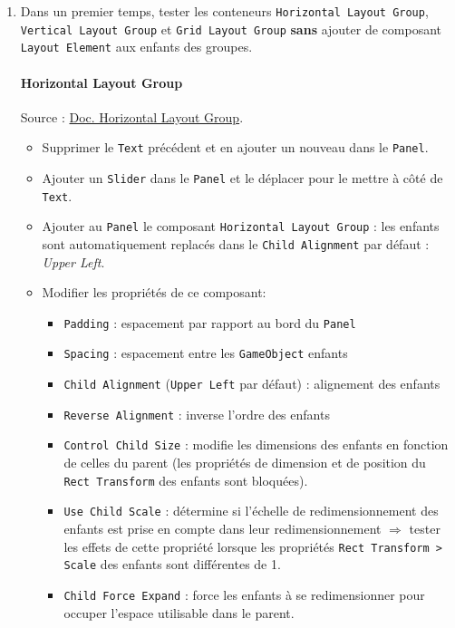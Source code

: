 \documentclass[a4paper,10pt]{article}
\newenvironment{solution}%
{\begin{tcolorbox}[breakable,colback=red!5!white,colframe=red!75!black,title=Solution]}%
{\end{tcolorbox}}
\begin{document}
\begin{enumerate}
	\item Dans un premier temps, tester les conteneurs \texttt{Horizontal Layout Group}, \texttt{Vertical Layout Group} et \texttt{Grid Layout Group} \textbf{sans} ajouter de composant \texttt{Layout Element} aux enfants des groupes.
	
\ifversionenseignant
\begin{solution}
	\paragraph{Horizontal Layout Group}
	
	Source : \href{https://docs.unity3d.com/Packages/com.unity.ugui@1.0/manual/script-HorizontalLayoutGroup.html}{Doc. Horizontal Layout Group}.
	
	\begin{itemize}
		\item Supprimer le \texttt{Text} précédent et en ajouter un nouveau dans le \texttt{Panel}.
		\item Ajouter un \texttt{Slider} dans le \texttt{Panel} et le déplacer pour le mettre à côté de \texttt{Text}.
		\item Ajouter au \texttt{Panel} le composant \texttt{Horizontal Layout Group} : les enfants sont automatiquement replacés dans le \texttt{Child Alignment} par défaut : \textit{Upper Left}.
		\item Modifier les propriétés de ce composant:
		\begin{itemize}
			\item \texttt{Padding} : espacement par rapport au bord du \texttt{Panel}
			\item \texttt{Spacing} : espacement entre les \texttt{GameObject} enfants
			\item \texttt{Child Alignment} (\texttt{Upper Left} par défaut) : alignement des enfants
			\item \texttt{Reverse Alignment} : inverse l'ordre des enfants
			\item \texttt{Control Child Size} : modifie les dimensions des enfants en fonction de celles du parent (les propriétés de dimension et de position du \texttt{Rect Transform} des enfants sont bloquées).
			\item \texttt{Use Child Scale} : détermine si l'échelle de redimensionnement des enfants est prise en compte dans leur redimensionnement $\Rightarrow$ tester les effets de cette propriété lorsque les propriétés \texttt{Rect Transform > Scale} des enfants sont différentes de 1.
			\item \texttt{Child Force Expand} : force les enfants à se redimensionner pour occuper l'espace utilisable dans le parent.
		\end{itemize}	
	\end{itemize}
	

\end{solution}
\end{enumerate}
\end{document}

